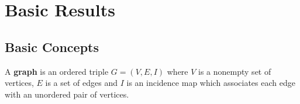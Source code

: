 

\section{Basic Results}
\subsection{Basic Concepts}
\begin{definition}
	A \textbf{graph} is an ordered triple $G = (V,E,I)$ where $V$ is a nonempty set of vertices, $E$ is a set of edges and $I$ is an incidence map which associates each edge with an unordered pair of vertices.
\end{definition}

